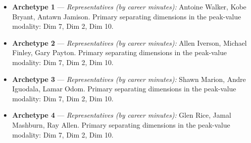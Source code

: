 \begin{itemize}
\item \textbf{Archetype 1} --- \emph{Representatives (by career minutes):} Antoine Walker, Kobe Bryant, Antawn Jamison. Primary separating dimensions in the peak-value modality: Dim 7, Dim 2, Dim 10.
\item \textbf{Archetype 2} --- \emph{Representatives (by career minutes):} Allen Iverson, Michael Finley, Gary Payton. Primary separating dimensions in the peak-value modality: Dim 7, Dim 2, Dim 10.
\item \textbf{Archetype 3} --- \emph{Representatives (by career minutes):} Shawn Marion, Andre Iguodala, Lamar Odom. Primary separating dimensions in the peak-value modality: Dim 7, Dim 2, Dim 10.
\item \textbf{Archetype 4} --- \emph{Representatives (by career minutes):} Glen Rice, Jamal Mashburn, Ray Allen. Primary separating dimensions in the peak-value modality: Dim 7, Dim 2, Dim 10.
\end{itemize}
